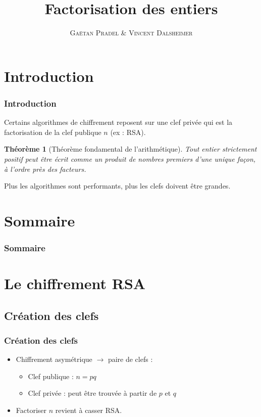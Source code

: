 \documentclass[utf8,10pt,french]{beamer}
\title[FdE]{Factorisation des entiers}
\author[GV]{\textsc{Gaëtan Pradel \& Vincent Dalsheimer}}
\institute{Université Bordeaux 1}
\newtheorem{theoreme}{Th{\'e}or{\`e}me}
\begin{document}
\frame{\titlepage}

\section{Introduction}
\begin{frame}
  \frametitle{Introduction}
Certains algorithmes de chiffrement reposent sur une clef privée qui est la factorisation de la clef publique $n$ (ex : RSA). \pause

\begin{theoreme}[Théorème fondamental de l'arithmétique]
Tout entier strictement positif peut être écrit comme un produit de nombres premiers d’une
unique façon, à l’ordre près des facteurs. \pause
\end{theoreme}

Plus les algorithmes sont performants, plus les clefs doivent être grandes.
\end{frame}

\section*{Sommaire}
\begin{frame}
  \frametitle{Sommaire}
  \tableofcontents
\end{frame}

\section{Le chiffrement RSA}
\subsection{Création des clefs}
\begin{frame}
  \frametitle{Création des clefs}
\begin{itemize}
\item Chiffrement asymétrique $\to$ paire de clefs :\pause
\begin{itemize}
\item Clef publique : $n = pq$ \pause
\item Clef privée : peut être trouvée à partir de $p$ et $q$ \pause
\end{itemize}
\item Factoriser $n$ revient à casser RSA.
\end{itemize}
\end{frame}
\end{document}

